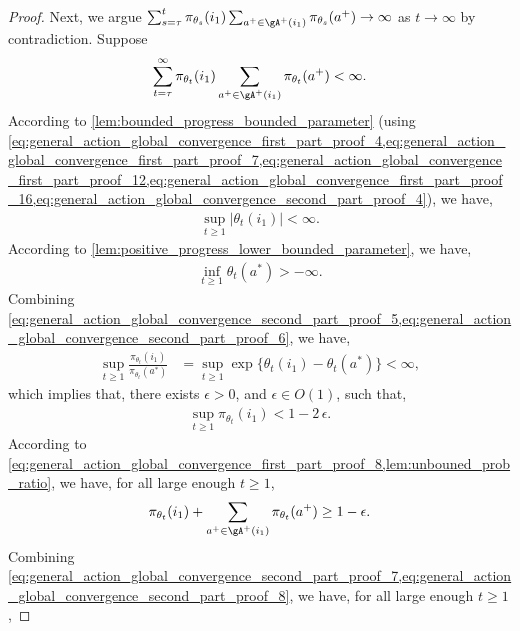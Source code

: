 \begin{proof}
Next, we argue $\sum_{s=\tau}^t \pi_{\theta_s}(i_1) \sum_{a^+ \in \gA^+(i_1)}{ \pi_{\theta_s}(a^+) } \to \infty$ as $t \to \infty$ by contradiction. Suppose
\begin{align}
\label{eq:general_action_global_convergence_second_part_proof_4}
    \sum_{t=\tau}^{\infty} \pi_{\theta_t}(i_1) \sum_{a^+ \in \gA^+(i_1)}{ \pi_{\theta_t}(a^+) } < \infty.
\end{align}
According to \cref{lem:bounded_progress_bounded_parameter} (using \cref{eq:general_action_global_convergence_first_part_proof_4,eq:general_action_global_convergence_first_part_proof_7,eq:general_action_global_convergence_first_part_proof_12,eq:general_action_global_convergence_first_part_proof_16,eq:general_action_global_convergence_second_part_proof_4}), we have,
\begin{align}
\label{eq:general_action_global_convergence_second_part_proof_5}
    \sup_{t \ge 1}{ |\theta_t(i_1)| } < \infty.
\end{align}
According to \cref{lem:positive_progress_lower_bounded_parameter}, we have,
\begin{align}
\label{eq:general_action_global_convergence_second_part_proof_6}
    \inf_{t \ge 1}{\theta_t(a^*)} > -\infty.
\end{align}
Combining \cref{eq:general_action_global_convergence_second_part_proof_5,eq:general_action_global_convergence_second_part_proof_6}, we have,
\begin{align}
\label{eq:general_action_global_convergence_second_part_proof_7}
    \sup_{t \ge 1}{ \frac{\pi_{\theta_t}(i_1)}{\pi_{\theta_t}(a^*)}} &= \sup_{t \ge 1} {\exp\{ \theta_t(i_1) - \theta_t(a^*) \}} < \infty,
\end{align}
which implies that, there exists $\epsilon > 0$, and $\epsilon \in O(1)$, such that,
\begin{align}
\label{eq:general_action_global_convergence_second_part_proof_8}
    \sup_{t \ge 1}{ \pi_{\theta_t}(i_1)} < 1 - 2 \, \epsilon.
\end{align}
According to \cref{eq:general_action_global_convergence_first_part_proof_8,lem:unbouned_prob_ratio}, we have, for all large enough $t \ge 1$,
\begin{align}
\label{eq:general_action_global_convergence_second_part_proof_9}
    \pi_{\theta_t}(i_1) + \sum_{a^+ \in \gA^+(i_1)}{ \pi_{\theta_t}(a^+) } \ge 1 - \epsilon.
\end{align}
Combining \cref{eq:general_action_global_convergence_second_part_proof_7,eq:general_action_global_convergence_second_part_proof_8}, we have, for all large enough $t \ge 1$,

\end{proof}
